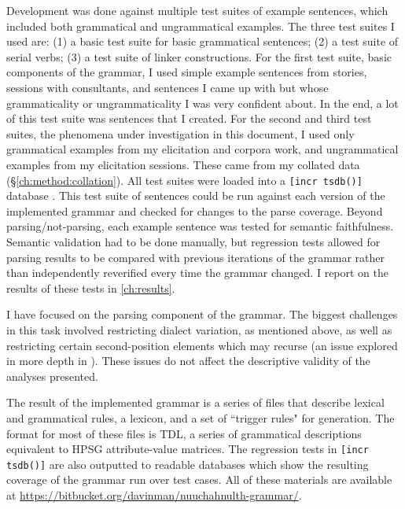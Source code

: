 Development was done against multiple test suites of example sentences, which included both grammatical and ungrammatical examples. The three test suites I used are: (1) a basic test suite for basic grammatical sentences; (2) a test suite of serial verbs; (3) a test suite of linker constructions. For the first test suite, basic components of the grammar, I used simple example sentences from stories, sessions with consultants, and sentences I came up with but whose grammaticality or ungrammaticality I was very confident about. In the end, a lot of this test suite was sentences that I created. For the second and third test suites, the phenomena under investigation in this document, I used only grammatical examples from my elicitation and corpora work, and ungrammatical examples from my elicitation sessions. These came from my collated data (\S\ref{ch:method:collation}).  All test suites were loaded into a \texttt{[incr tsdb()]} database \citep{oepen2001}. This test suite of sentences could be run against each version of the implemented grammar and checked for changes to the parse coverage. Beyond parsing/not-parsing, each example sentence was tested for semantic faithfulness. Semantic validation had to be done manually, but regression tests allowed for parsing results to be compared with previous iterations of the grammar rather than independently reverified every time the grammar changed. I report on the results of these tests in \cref{ch:results}.

I have focused on the parsing component of the grammar. The biggest challenges in this task involved restricting dialect variation, as mentioned above, as well as restricting certain second-position elements which may recurse (an issue explored in more depth in \citealt{bender2010reweaving}). These issues do not affect the descriptive validity of the analyses presented.


The result of the implemented grammar is a series of files that describe lexical and grammatical rules, a lexicon, and a set of ``trigger rules" for generation. The format for most of these files is TDL, a series of grammatical descriptions equivalent to HPSG attribute-value matrices. The regression tests in \texttt{[incr tsdb()]} \citep{oepen2001} are also outputted to readable databases which show the resulting coverage of the grammar run over test cases. All of these materials are available at \url{https://bitbucket.org/davinman/nuuchahnulth-grammar/}.

